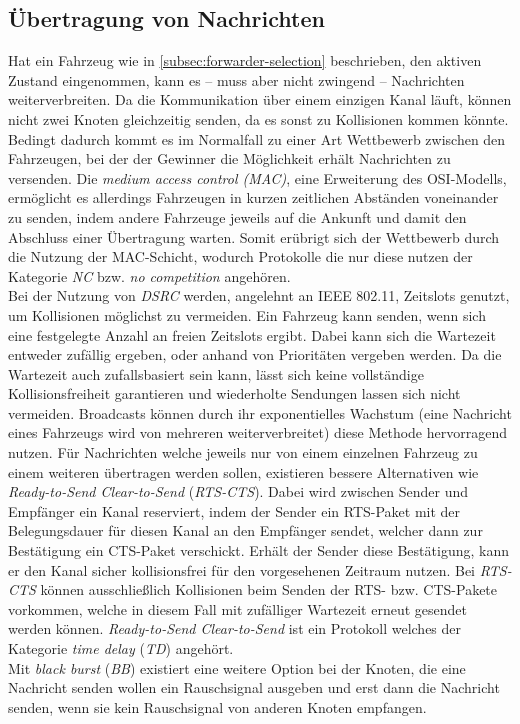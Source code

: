 \documentclass[english,runningheads,a4paper]{llncs}[2018/03/10]
\begin{document}
\subsection{Übertragung von Nachrichten}
Hat ein Fahrzeug wie in \ref{subsec:forwarder-selection} beschrieben, den aktiven Zustand eingenommen, kann es – muss aber nicht zwingend – Nachrichten weiterverbreiten.
Da die Kommunikation über einem einzigen Kanal läuft, können nicht zwei Knoten gleichzeitig senden, da es sonst zu Kollisionen kommen könnte.
Bedingt dadurch kommt es im Normalfall zu einer Art Wettbewerb zwischen den Fahrzeugen, bei der der Gewinner die Möglichkeit erhält Nachrichten zu versenden.
Die \textit{medium access control (MAC)}, eine Erweiterung des OSI-Modells, ermöglicht es allerdings Fahrzeugen in kurzen zeitlichen Abständen voneinander zu senden, indem andere Fahrzeuge jeweils auf die Ankunft und damit den Abschluss einer Übertragung warten.
Somit erübrigt sich der Wettbewerb durch die Nutzung der MAC-Schicht, wodurch Protokolle die nur diese nutzen der Kategorie \textit{NC} bzw. \textit{no competition} angehören.\\
Bei der Nutzung von \textit{DSRC} werden, angelehnt an IEEE 802.11, Zeitslots genutzt, um Kollisionen möglichst zu vermeiden.
Ein Fahrzeug kann senden, wenn sich eine festgelegte Anzahl an freien Zeitslots ergibt.
Dabei kann sich die Wartezeit entweder zufällig ergeben, oder anhand von Prioritäten vergeben werden.
Da die Wartezeit auch zufallsbasiert sein kann, lässt sich keine vollständige Kollisionsfreiheit garantieren und wiederholte Sendungen lassen sich nicht vermeiden.
Broadcasts können durch ihr exponentielles Wachstum (eine Nachricht eines Fahrzeugs wird von mehreren weiterverbreitet) diese Methode hervorragend nutzen.
Für Nachrichten welche jeweils nur von einem einzelnen Fahrzeug zu einem weiteren übertragen werden sollen, existieren bessere Alternativen wie \textit{Ready-to-Send Clear-to-Send} (\textit{RTS-CTS}).
Dabei wird zwischen Sender und Empfänger ein Kanal reserviert, indem der Sender ein RTS-Paket mit der Belegungsdauer für diesen Kanal an den Empfänger sendet, welcher dann zur Bestätigung ein CTS-Paket verschickt.
Erhält der Sender diese Bestätigung, kann er den Kanal sicher kollisionsfrei für den vorgesehenen Zeitraum nutzen.
Bei \textit{RTS-CTS} können ausschließlich Kollisionen beim Senden der RTS- bzw. CTS-Pakete vorkommen, welche in diesem Fall mit zufälliger Wartezeit erneut gesendet werden können.
\textit{Ready-to-Send Clear-to-Send} ist ein Protokoll welches der Kategorie \textit{time delay} (\textit{TD}) angehört.\\
Mit \textit{black burst} (\textit{BB}) existiert eine weitere Option bei der Knoten, die eine Nachricht senden wollen ein Rauschsignal ausgeben und erst dann die Nachricht senden, wenn sie kein Rauschsignal von anderen Knoten empfangen\cite{conti2013mobile}.
\end{document}
